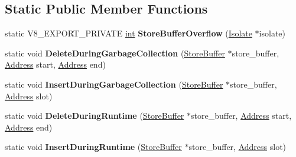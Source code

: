 \subsection*{Static Public Member Functions}
\begin{DoxyCompactItemize}
\item 
\mbox{\label{classv8_1_1internal_1_1StoreBuffer_aef14ad54676b25cc0d743e6fd7b14017}} 
static V8\+\_\+\+E\+X\+P\+O\+R\+T\+\_\+\+P\+R\+I\+V\+A\+TE \mbox{\hyperlink{classint}{int}} {\bfseries Store\+Buffer\+Overflow} (\mbox{\hyperlink{classv8_1_1internal_1_1Isolate}{Isolate}} $\ast$isolate)
\item 
\mbox{\label{classv8_1_1internal_1_1StoreBuffer_ac5fe022f2259ecb93e4d7816f922c571}} 
static void {\bfseries Delete\+During\+Garbage\+Collection} (\mbox{\hyperlink{classv8_1_1internal_1_1StoreBuffer}{Store\+Buffer}} $\ast$store\+\_\+buffer, \mbox{\hyperlink{classuintptr__t}{Address}} start, \mbox{\hyperlink{classuintptr__t}{Address}} end)
\item 
\mbox{\label{classv8_1_1internal_1_1StoreBuffer_ac44105d8c4ea7e0d356e482c68e382a4}} 
static void {\bfseries Insert\+During\+Garbage\+Collection} (\mbox{\hyperlink{classv8_1_1internal_1_1StoreBuffer}{Store\+Buffer}} $\ast$store\+\_\+buffer, \mbox{\hyperlink{classuintptr__t}{Address}} slot)
\item 
\mbox{\label{classv8_1_1internal_1_1StoreBuffer_aa82c235a1b75462848e4595b79e95d5c}} 
static void {\bfseries Delete\+During\+Runtime} (\mbox{\hyperlink{classv8_1_1internal_1_1StoreBuffer}{Store\+Buffer}} $\ast$store\+\_\+buffer, \mbox{\hyperlink{classuintptr__t}{Address}} start, \mbox{\hyperlink{classuintptr__t}{Address}} end)
\item 
\mbox{\label{classv8_1_1internal_1_1StoreBuffer_af3c9e3aba67dd67ee0d1ddaf74fe4234}} 
static void {\bfseries Insert\+During\+Runtime} (\mbox{\hyperlink{classv8_1_1internal_1_1StoreBuffer}{Store\+Buffer}} $\ast$store\+\_\+buffer, \mbox{\hyperlink{classuintptr__t}{Address}} slot)
\end{DoxyCompactItemize}
